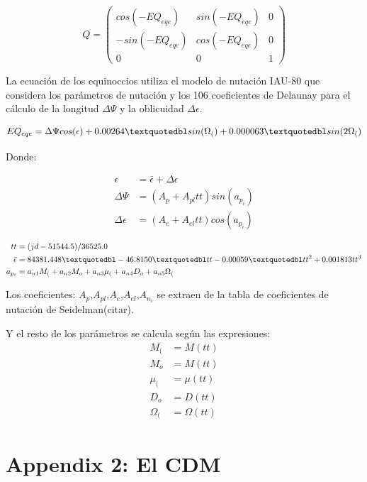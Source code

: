  \[ Q =
\left( \begin{array}{ccc}
 cos(-EQ_{eqe}) & sin(-EQ_{eqe}) &  0 \\ 
 -sin(-EQ_{eqe}) & cos(-EQ_{eqe}) &  0 \\
 0 & 0 & 1
\end{array} \right) \] 


La ecuaci\'on de los equinoccios utiliza el modelo de nutaci\'on IAU-80 que considera los par\'ametros de nutaci\'on y los 106 coeficientes de Delaunay para el c\'alculo de la longitud $\Delta \Psi$ y la oblicuidad $\Delta \epsilon$.

\begin{equation}
 EQ_{eqe}=\Delta \Psi cos({\epsilon}) + 0.00264 \textquotedbl sin(\Omega_{(}) + 0.000063 \textquotedbl sin (2 \Omega_{(})
\end{equation}

Donde:

\begin{align*}
 \epsilon &= {\bar{\epsilon}} + \Delta \epsilon\\
 \Delta \Psi &= (A_{p} + A_{pl} tt) sin(a_{p_{i}})\\
 \Delta \epsilon &= (A_{e} + A_{el} tt) cos(a_{p_{i}})
\end{align*}

\begin{align*}
 tt &= (jd - 51544.5)/36525.0\\
 {\bar{\epsilon}} &= 84381.448 \textquotedbl - 46.8150 \textquotedbl tt - 0.00059 \textquotedbl tt^{2} + 0.001813 tt^{3}\\
 a_{p_{i}} &= a_{n1}M_{(}+a_{n2}M_{o}+a_{n3}\mu_{(}+a_{n4}D_{o}+a_{n5}\Omega_{(}
\end{align*}

Los coeficientes: $A_{p}$,$A_{pl}$,$A_{e}$,$A_{el}$,$A_{n_{i}}$ se extraen de la tabla de coeficientes de nutaci\'on de Seidelman(citar).

Y el resto de los par\'ametros se calcula seg\'un las expresiones:\\

\begin{align*}
 M_{(} & = M(tt)\\
 M_{o} & = M(tt)\\
 \mu_{(} &= \mu(tt)\\
 D_{o} &= D(tt)\\
 \Omega_{(} &= \Omega(tt)
\end{align*}

\section{Appendix 2: El CDM}
\label{App2}

